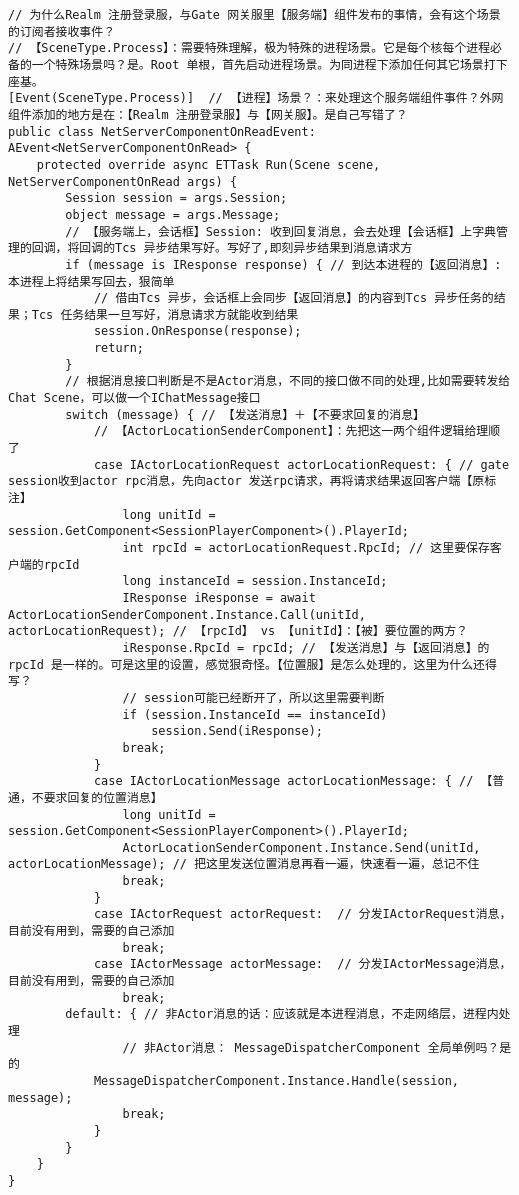 \documentclass[9pt, b5paper]{article}
\begin{document}
\begin{verbatim}
// 为什么Realm 注册登录服，与Gate 网关服里【服务端】组件发布的事情，会有这个场景的订阅者接收事件？
// 【SceneType.Process】：需要特殊理解，极为特殊的进程场景。它是每个核每个进程必备的一个特殊场景吗？是。Root 单根，首先启动进程场景。为同进程下添加任何其它场景打下座基。
[Event(SceneType.Process)]  // 【进程】场景？：来处理这个服务端组件事件？外网组件添加的地方是在：【Realm 注册登录服】与【网关服】。是自己写错了？
public class NetServerComponentOnReadEvent: AEvent<NetServerComponentOnRead> {
    protected override async ETTask Run(Scene scene, NetServerComponentOnRead args) {
        Session session = args.Session;
        object message = args.Message;
        // 【服务端上，会话框】Session: 收到回复消息，会去处理【会话框】上字典管理的回调，将回调的Tcs 异步结果写好。写好了,即刻异步结果到消息请求方
        if (message is IResponse response) { // 到达本进程的【返回消息】: 本进程上将结果写回去，狠简单
            // 借由Tcs 异步，会话框上会同步【返回消息】的内容到Tcs 异步任务的结果；Tcs 任务结果一旦写好，消息请求方就能收到结果
            session.OnResponse(response); 
            return; 
        } 
        // 根据消息接口判断是不是Actor消息，不同的接口做不同的处理,比如需要转发给Chat Scene，可以做一个IChatMessage接口
        switch (message) { // 【发送消息】＋【不要求回复的消息】
            // 【ActorLocationSenderComponent】：先把这一两个组件逻辑给理顺了
            case IActorLocationRequest actorLocationRequest: { // gate session收到actor rpc消息，先向actor 发送rpc请求，再将请求结果返回客户端【原标注】 
                long unitId = session.GetComponent<SessionPlayerComponent>().PlayerId;
                int rpcId = actorLocationRequest.RpcId; // 这里要保存客户端的rpcId 
                long instanceId = session.InstanceId;
                IResponse iResponse = await ActorLocationSenderComponent.Instance.Call(unitId, actorLocationRequest); // 【rpcId】 vs 【unitId】：【被】要位置的两方？
                iResponse.RpcId = rpcId; // 【发送消息】与【返回消息】的 rpcId 是一样的。可是这里的设置，感觉狠奇怪。【位置服】是怎么处理的，这里为什么还得写？
                // session可能已经断开了，所以这里需要判断
                if (session.InstanceId == instanceId) 
                    session.Send(iResponse);
                break;
            }
            case IActorLocationMessage actorLocationMessage: { // 【普通，不要求回复的位置消息】
                long unitId = session.GetComponent<SessionPlayerComponent>().PlayerId;
                ActorLocationSenderComponent.Instance.Send(unitId, actorLocationMessage); // 把这里发送位置消息再看一遍，快速看一遍，总记不住
                break;
            }
            case IActorRequest actorRequest:  // 分发IActorRequest消息，目前没有用到，需要的自己添加 
                break;
            case IActorMessage actorMessage:  // 分发IActorMessage消息，目前没有用到，需要的自己添加 
                break;
        default: { // 非Actor消息的话：应该就是本进程消息，不走网络层，进程内处理
                // 非Actor消息： MessageDispatcherComponent 全局单例吗？是的
            MessageDispatcherComponent.Instance.Handle(session, message); 
                break;
            }
        }
    }
}
\end{verbatim}
\end{document}
